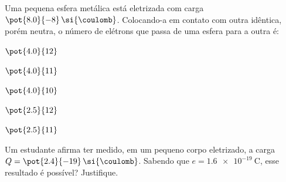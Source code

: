 \begin{questao}[2]{}

Uma pequena esfera metálica está eletrizada com carga $\pot{8.0}{-8}\,\si{\coulomb}$.
Colocando-a em contato com outra idêntica, porém neutra, o número de elétrons que
passa de uma esfera para a outra é:
\begin{alternativas}[3]
\item $\pot{4.0}{12}$
\item $\pot{4.0}{11}$
\item $\pot{4.0}{10}$
\item $\pot{2.5}{12}$
\item $\pot{2.5}{11}$
\end{alternativas}


\end{questao}
\begin{questao}[2]{}

Um estudante afirma ter medido, em um pequeno corpo eletrizado, a carga
$Q = \pot{2.4}{-19}\,\si{\coulomb}$. Sabendo que $e = \SI{1.6e-19}{\coulomb}$,
esse resultado é possível? Justifique.


\end{questao}

